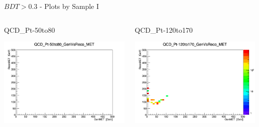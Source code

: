 \documentclass[8pt]{beamer}
\begin{document}
\begin{frame}{$BDT>0.3$ - Plots by Sample I }
\begin{columns}
\begin{block}{QCD\_Pt-50to80}
 
\centering
\includegraphics[width=\linewidth]{img/QCD_Pt-50to80_GenVsReco_MET.png} 
 
\end{block}

\begin{block}{QCD\_Pt-120to170}
 
\centering
\includegraphics[width=\linewidth]{img/QCD_Pt-120to170_GenVsReco_MET.png} 
 
\end{block}


\end{columns} 
 
\end{frame}
\end{document}
